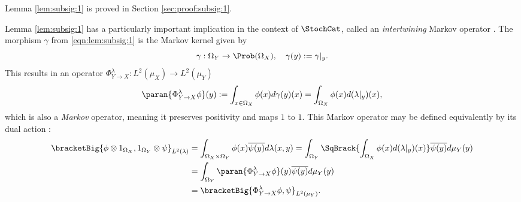 \documentclass[12pt,oneside,pb-diagram]{article}
\begin{document}
Lemma \ref{lem:subsig:1} is proved in Section \ref{sec:proof:subsig:1}.

\begin{Erg}{}{} 
	Lemma \ref{lem:subsig:1} has a particularly important implication in the context of $\StochCat$, called an \emph{intertwining} Markov operator \cite[Sec 1.3]{LemanczykEtAl1993gaussian}. The morphism $\gamma$ from \eqref{eqn:lem:subsig:1} is the Markov kernel given by
	\[ \gamma : \Omega_Y \to \Prob(\Omega_X), \quad \gamma(y) := \gamma|_{y}. \]
	This results in an operator $\Phi_{Y\to X}^{\lambda} : L^2(\mu_X) \to L^2(\mu_Y)$
	\[ \paran{ \Phi_{Y\to X}^{\lambda} \phi }(y) := \int_{x\in \Omega_X} \phi(x) d\gamma(y)(x) = \int_{\Omega_X} \phi(x) d (\lambda|_y)(x), \]
	which is also a \emph{Markov} operator, meaning it preserves positivity and maps $1$ to $1$. This Markov operator may be defined equivalently by its dual action :
	\[\begin{split}
		\bracketBig{ \phi \otimes 1_{\Omega_X} , 1_{\Omega_Y} \otimes \psi }_{L^2(\lambda)} &= \int_{\Omega_X \times \Omega_Y} \phi(x) \overline{ \psi(y) } d\lambda(x,y) = \int_{\Omega_Y} \SqBrack{ \int_{\Omega_X} \phi(x) d (\lambda|_y)(x) } \overline{ \psi(y) } d\mu_Y(y) \\
		& = \int_{\Omega_Y} \paran{ \Phi_{Y\to X}^{\lambda} \phi }(y) \overline{ \psi(y) } d\mu_Y(y) \\
		&= \bracketBig{ \Phi_{Y\to X}^{\lambda} \phi, \psi }_{L^2(\mu_Y)}.
	\end{split}\]
\end{Erg}
\end{document}
